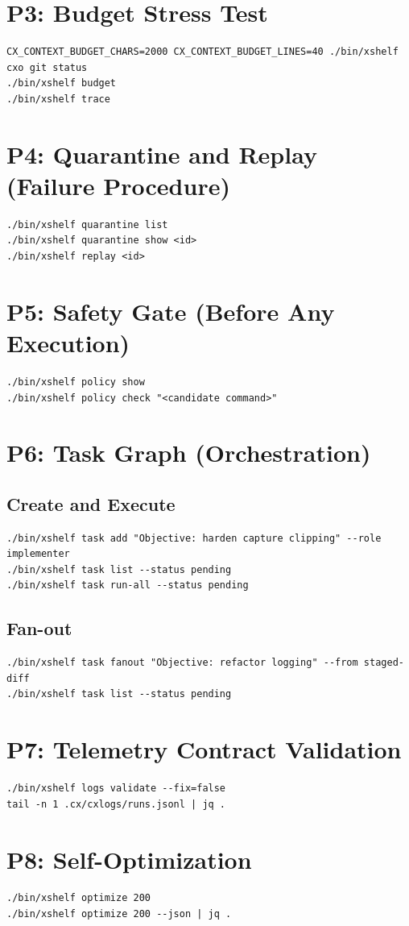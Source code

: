 \documentclass[11pt]{article}
\begin{document}
\section{P3: Budget Stress Test}
\begin{lstlisting}[style=cx]
CX_CONTEXT_BUDGET_CHARS=2000 CX_CONTEXT_BUDGET_LINES=40 ./bin/xshelf cxo git status
./bin/xshelf budget
./bin/xshelf trace
\end{lstlisting}

\section{P4: Quarantine and Replay (Failure Procedure)}
\begin{lstlisting}[style=cx]
./bin/xshelf quarantine list
./bin/xshelf quarantine show <id>
./bin/xshelf replay <id>
\end{lstlisting}

\section{P5: Safety Gate (Before Any Execution)}
\begin{lstlisting}[style=cx]
./bin/xshelf policy show
./bin/xshelf policy check "<candidate command>"
\end{lstlisting}

\section{P6: Task Graph (Orchestration)}
\subsection*{Create and Execute}
\begin{lstlisting}[style=cx]
./bin/xshelf task add "Objective: harden capture clipping" --role implementer
./bin/xshelf task list --status pending
./bin/xshelf task run-all --status pending
\end{lstlisting}

\subsection*{Fan-out}
\begin{lstlisting}[style=cx]
./bin/xshelf task fanout "Objective: refactor logging" --from staged-diff
./bin/xshelf task list --status pending
\end{lstlisting}

\section{P7: Telemetry Contract Validation}
\begin{lstlisting}[style=cx]
./bin/xshelf logs validate --fix=false
tail -n 1 .cx/cxlogs/runs.jsonl | jq .
\end{lstlisting}

\section{P8: Self-Optimization}
\begin{lstlisting}[style=cx]
./bin/xshelf optimize 200
./bin/xshelf optimize 200 --json | jq .
\end{lstlisting}
\end{document}
